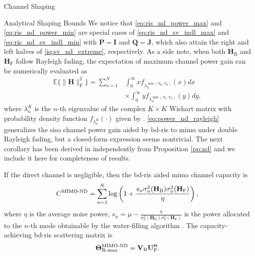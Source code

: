 \documentclass[journal]{IEEEtran}
\begin{document}
\begin{section}{Channel Shaping}
\begin{subsection}{Analytical Shaping Bounds}
		We notice that \eqref{eq:ris_nd_power_max} and \eqref{eq:ris_nd_power_min} are special cases of \eqref{eq:ris_nd_sv_indl_max} and \eqref{eq:ris_nd_sv_indl_min} with $\mathbf{P} = \mathbf{I}$ and $\mathbf{Q} = \mathbf{J}$, which also attain the right and left halves of \eqref{iq:sv_nd_extreme}, respectively.
		As a side note, when both $\mathbf{H}_\mathrm{B}$ and $\mathbf{H}_\mathrm{F}$ follow Rayleigh fading, the expectation of maximum channel power gain can be numerically evaluated as
		\begin{equation}
			\label{eq:power_nd_rayleigh}
			\begin{split}
				\mathbb{E}\bigl\{ \lVert \mathbf{H} \rVert _ \mathrm{F}^2 \bigr\} = \sum_{n=1}^N
				& \int_0^\infty x f_{\lambda_n^{\min(N_\mathrm{R},N_\mathrm{S})}}(x) d x         \\
				& \times \int_0^\infty y f_{\lambda_n^{\min(N_\mathrm{S},N_\mathrm{T})}}(y) d y,
			\end{split}
		\end{equation}
		where $\lambda_n^{K}$ is the $n$-th eigenvalue of the complex $K \times K$ Wishart matrix with probability density function $f_{\lambda_n^{K}}(\cdot)$ given by \cite[(51)]{Zanella2009}.
		\eqref{eq:power_nd_rayleigh} generalizes the \gls{siso} channel power gain aided by \gls{bd}-\gls{ris} \cite[(58)]{Shen2020a} to \gls{mimo} under double Rayleigh fading, but a closed-form expression seems nontrivial.
		The next corollary has been derived in \cite{Bartoli2023} independently from Proposition \ref{pp:nd} and we include it here for completeness of results.
		\begin{corollary}
			\label{co:nd_capacity_snr_general}
			If the direct channel is negligible, then the \gls{bd}-\gls{ris} aided \gls{mimo} channel capacity is
			\begin{equation}
				\label{eq:capacity_nd}
				C^\textnormal{MIMO-ND} = \sum_{n=1}^N \log \left(1 + \frac{s_n \sigma_n^2(\mathbf{H}_\mathrm{B}) \sigma_n^2(\mathbf{H}_\mathrm{F})}{\eta}\right),
			\end{equation}
			where $\eta$ is the average noise power, $s_n = \mu - \frac{\eta}{\sigma_n^2(\mathbf{H}_\mathrm{B}) \sigma_n^2(\mathbf{H}_\mathrm{F})}$ is the power allocated to the $n$-th mode obtainable by the water-filling algorithm \cite{Clerckx2013}.
			The capacity-achieving \gls{bd}-\gls{ris} scattering matrix is
			\begin{equation}
				\label{eq:ris_nd_rate_max}
				\mathbf{\Theta}_\textnormal{R-max}^\textnormal{MIMO-ND} = \mathbf{V}_\mathrm{B} \mathbf{U}_\mathrm{F}^\mathsf{H}.
			\end{equation}
		\end{corollary}


\end{subsection}
\end{section}
\end{document}
